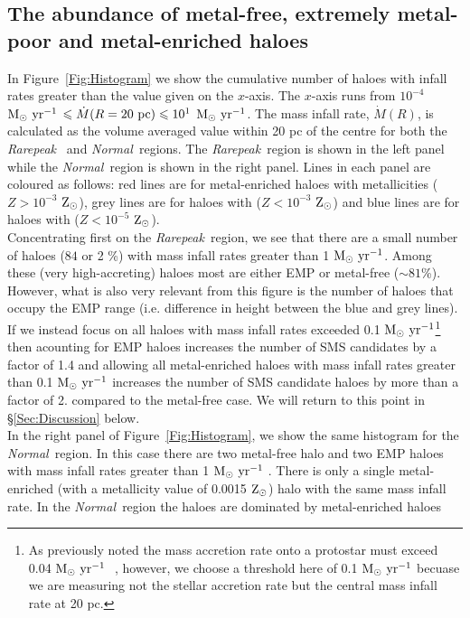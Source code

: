 \documentclass[graphics, twocolumn, usenatbib]{mn2e}
\newcommand{\msolaryr} {$\rm{M_{\odot}~yr^{-1}}~$}
\newcommand{\msolaryrc} {$\rm{M_{\odot}~yr^{-1}}$}
\newcommand{\zsolarc} {$\rm{Z_{\odot}}$}
\newcommand{\rarepeak} {\textit{Rarepeak~}}
\newcommand{\normal} {\textit{Normal~}}
\begin{document}
\subsection{The abundance of metal-free, extremely metal-poor and metal-enriched haloes}

In Figure~\ref{Fig:Histogram} we show the cumulative number of haloes with infall rates greater than
the value given on the $x$-axis. The $x$-axis runs from
$10^{-4}$ \msolaryr $\leq \dot{M}(R=20~{\rm pc}) \leq 10^{1}$ \msolaryrc. 
 The mass infall rate,
$\dot{M}(R)$, is calculated as the volume averaged value within 20 pc of the centre for both the \rarepeak 
and \normal regions. The
\rarepeak region is shown in the left panel while the \normal region is shown in the right 
panel. Lines in each panel are coloured as follows: red lines are for metal-enriched haloes with
metallicities ($Z > 10^{-3}$ \zsolarc), grey lines are for haloes with ($Z < 10^{-3}$ \zsolarc) and
blue lines are for haloes with ($Z < 10^{-5}$ \zsolarc).\\
\indent Concentrating first on the \rarepeak region, we see that there are a small number of
haloes ($84$ or 2 \%) with mass infall rates greater than 1 \msolaryrc. Among these (very high-accreting)
haloes most are either EMP or metal-free ($\sim 81$\%). However, what is also very relevant from this figure
is the number of haloes that occupy the EMP range (i.e. difference in height between the
blue and grey lines). If we instead focus on all haloes with mass infall rates exceeded 0.1
\msolaryrc\footnote{As previously noted the mass accretion rate onto a protostar must exceed 0.04 \msolaryr
  \cite{Sakurai_2016}, however, we choose a threshold here of 0.1 \msolaryr becuase we are measuring not the
  stellar accretion rate but the central mass infall rate at 20 pc.} 
then acounting for EMP
haloes increases the number of SMS candidates by a factor of 1.4 and allowing all metal-enriched haloes
with mass infall rates greater than 0.1 \msolaryr increases the number of SMS candidate haloes
by more than a factor of 2.
compared to the metal-free case. We will return to this point in \S \ref{Sec:Discussion} below. \\
\indent In the right panel of Figure~\ref{Fig:Histogram},
we show the same histogram for the \normal region. In this case there are two metal-free halo
and two EMP haloes with mass infall rates greater than 1 \msolaryr. There is only a single metal-enriched
(with a metallicity value of 0.0015 \zsolarc)
halo with the same mass infall rate. In the \normal region the haloes are dominated by metal-enriched haloes
\end{document}
